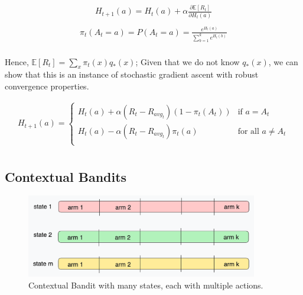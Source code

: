\begin{equation}
    \begin{split}
        H_{t+1}(a) = H_t(a) + \alpha \frac{\partial \mathbb{E}[R_t]}{\partial H_t(a)} \\
        \label{eq:gradient-bandit}
    \end{split}
\end{equation}
\begin{equation}
    \begin{split}
        \pi_t(A_t = a) = P(A_t = a) = \frac{e^{H_t(a)}}{\sum_{b=1}^{k} e^{H_t(b)}} \\
        \label{eq:gradient-bandit-policy}
    \end{split}
\end{equation}

Hence, $\mathbb{E}[R_t] = \sum_{x} \pi_t(x) q_*(x)$; Given that we do not know $q_*(x)$, we can show that
this is an instance of stochastic gradient ascent with robust convergence properties.

\begin{equation}
    \begin{split}
        H_{t+1}(a) = \begin{cases}
            H_t(a) + \alpha (R_t - R_{avg_t}) (1 - \pi_t(A_t)) & \text{if } a = A_t \\
            H_t(a) - \alpha (R_t - R_{avg_t}) \pi_t(a) &  \text{for all } a \neq A_t \\
        \end{cases} \\
        \label{eq:gradient-bandit-gradient}
    \end{split}
\end{equation}


\subsection{Contextual Bandits}


\begin{figure}[h]
    \centering
    \includegraphics[width=0.9\textwidth]{img/contextual_bandit.png}
    \caption{Contextual Bandit with many states, each with multiple actions.}
    \label{fig:contextual-bandit}
\end{figure}

